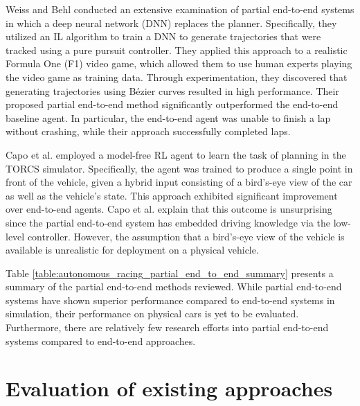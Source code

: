 Weiss and Behl \cite{Weiss2020, Weiss2022} conducted an extensive examination of partial end-to-end systems in which a deep neural network (DNN) replaces the planner. 
Specifically, they utilized an IL algorithm to train a DNN to generate trajectories that were tracked using a pure pursuit controller. 
They applied this approach to a realistic Formula One (F1) video game, which allowed them to use human experts playing the video game as training data.
Through experimentation, they discovered that generating trajectories using B\'ezier curves resulted in high performance. 
Their proposed partial end-to-end method significantly outperformed the end-to-end baseline agent. 
In particular, the end-to-end agent was unable to finish a lap without crashing, while their approach successfully completed laps.

Capo et al. \cite{Capo2020} employed a model-free RL agent to learn the task of planning in the TORCS simulator. 
Specifically, the agent was trained to produce a single point in front of the vehicle, given a hybrid input consisting of a bird's-eye view of the car as well as the vehicle's state. 
This approach exhibited significant improvement over end-to-end agents. 
Capo et al. \cite{Capo2020} explain that this outcome is unsurprising since the partial end-to-end system has embedded driving knowledge via the low-level controller. 
However, the assumption that a bird's-eye view of the vehicle is available is unrealistic for deployment on a physical vehicle.

Table \ref{table:autonomous_racing_partial_end_to_end_summary} presents a summary of the partial end-to-end methods reviewed. 
While partial end-to-end systems have shown superior performance compared to end-to-end systems in simulation, their performance on physical cars is yet to be evaluated. 
Furthermore, there are relatively few research efforts into partial end-to-end systems compared to end-to-end approaches.





\section{Evaluation of existing approaches}

